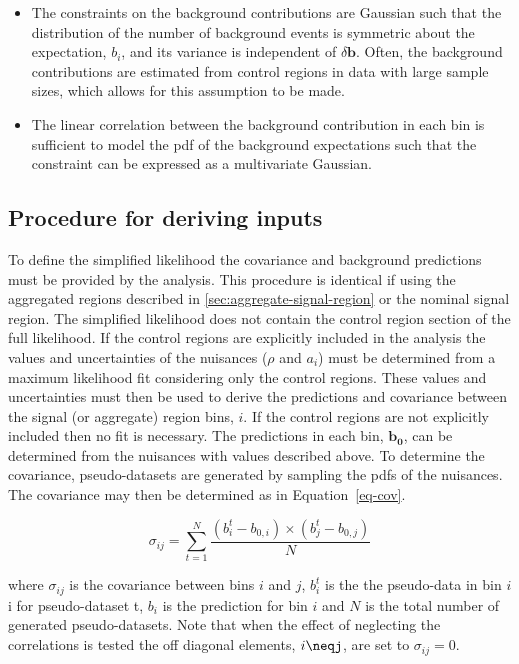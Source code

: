 \begin{itemize}
\item{The constraints on the background contributions are Gaussian such that the distribution of the number of background events is symmetric about the expectation, $b_{i}$, 
and its variance is independent of $\delta \mathbf{b}$. Often, the background contributions are estimated from control regions in data with large sample sizes, which allows for this 
assumption to be made.}

\item{The linear correlation between the background contribution in each bin is sufficient to model the  pdf of the background expectations such that the constraint 
can be expressed as a multivariate Gaussian.}
\end{itemize}



\subsection{Procedure for deriving inputs}

To define the simplified likelihood the covariance and background predictions must be 
provided by the analysis. This procedure is identical if using the 
aggregated regions described in \ref{sec:aggregate-signal-region} or the nominal signal region. 
The simplified likelihood does not contain the control region 
section of the full likelihood. If the control regions are explicitly included in the analysis
the values and uncertainties of the nuisances ($\rho$ and $a_i$)
must be determined from a maximum likelihood fit considering only the control regions.
These values and uncertainties must then be used to derive the predictions and covariance
between the signal (or aggregate) region bins, $i$. If the control regions are not explicitly 
included then no fit is necessary. The predictions in each bin, $\mathbf{b_0}$, can be 
determined from the nuisances with values described above. To determine the covariance, pseudo-datasets are generated
by sampling the pdfs of the nuisances. The covariance may then be determined as in Equation~\ref{eq-cov}.

\begin{equation}
\sigma_{ij}=\sum^N_{t=1}{\frac{(b^t_i-b_{0,i})\times(b^t_j-b_{0,j})}{N}}
\label{eq-cov}
\end{equation}

where $\sigma_{ij}$ is the covariance between bins $i$ and $j$, $b^t_i$ is the
the pseudo-data in bin $i$i for pseudo-dataset t, 
$b_i$ is the prediction for bin $i$ and $N$ is the total number of generated pseudo-datasets.
Note that when the effect of neglecting the correlations is tested the off diagonal 
elements, $i\neqj$, are set to $\sigma_{ij} = 0$.


